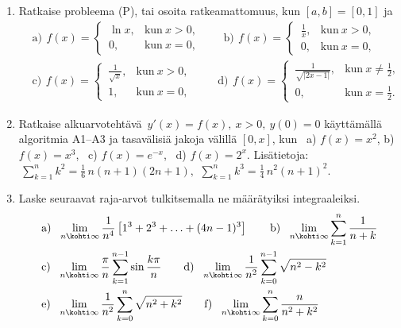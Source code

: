\Harj
\begin{enumerate}

\item
Ratkaise probleema (P), tai osoita ratkeamattomuus, kun $[a,b]=[0,1]$ ja
\begin{align*}
&\text{a)}\,\ f(x)=\begin{cases} 
                   \,\ln x, &\text{kun}\ x>0, \\ \,0, &\text{kun}\ x=0,
                   \end{cases} \qquad
 \text{b)}\,\ f(x)=\begin{cases} 
                   \,\frac{1}{x}, &\text{kun}\ x>0, \\ \,0, &\text{kun}\ x=0,
                   \end{cases} \\
&\text{c)}\,\ f(x)=\begin{cases} 
                   \,\frac{1}{\sqrt{x}}, &\text{kun}\ x>0, \\ \,1, &\text{kun}\ x=0,
                   \end{cases} \qquad\
 \text{d)}\,\ f(x)=\begin{cases} 
                   \,\frac{1}{\sqrt{|2x-1|}}, &\text{kun}\ x \neq \frac{1}{2}, \\ 
                   \,0,                       &\text{kun}\ x=\frac{1}{2}.
                   \end{cases}
\end{align*} 

\item
Ratkaise alkuarvotehtävä $\,y'(x)=f(x),\ x>0,\ y(0)=0$ käyttämällä algoritmia A1--A3 ja
tasavälisiä jakoja välillä $[0,x]$, kun \ a) $f(x)=x^2$, \newline
b) $f(x)=x^3$, \ c) $f(x)=e^{-x}$, \ d) $f(x)=2^x$. \newline
Lisätietoja: $\,\sum_{k=1}^n k^2 = \frac{1}{6}\,n(n+1)(2n+1),\,\
\sum_{k=1}^n k^3 = \frac {1}{4}\,n^2(n+1)^2$.

\item
Laske seuraavat raja-arvot tulkitsemalla ne määrätyiksi integraaleiksi.
\begin{align*}
&\text{a)}\ \ \lim_{n\kohti\infty} \frac{1}{n^4}\left[1^3+2^3+ \ldots +(4n-1)^3\right] \qquad
 \text{b)}\ \ \lim_{n\kohti\infty} \sum_{k=1}^n \frac{1}{n+k} \\
&\text{c)}\ \ \lim_{n\kohti\infty} \frac{\pi}{n} \sum_{k=1}^{n-1} \sin\frac{k\pi}{n} \qquad
 \text{d)}\ \ \lim_{n\kohti\infty} \frac{1}{n^2} \sum_{k=0}^{n-1} \sqrt{n^2-k^2} \\
&\text{e)}\ \ \lim_{n\kohti\infty} \frac{1}{n^2} \sum_{k=0}^{n} \sqrt{n^2+k^2} \qquad
 \text{f)}\ \ \lim_{n\kohti\infty} \sum_{k=0}^n \frac{n}{n^2+k^2}
\end{align*}


\end{enumerate}
